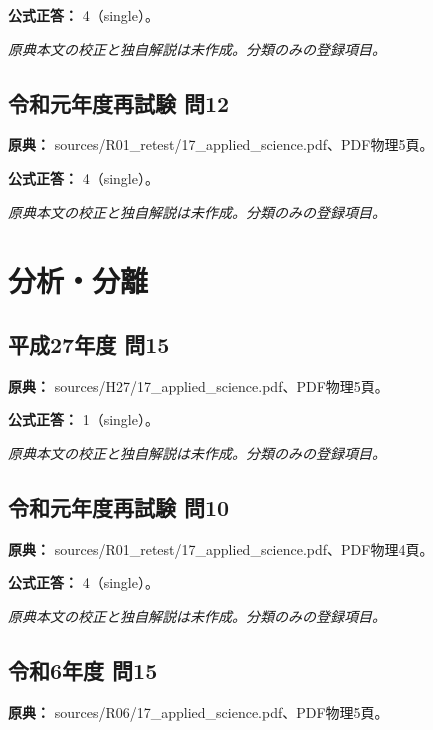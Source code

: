 \textbf{公式正答：} 4（single）。

\par\textit{原典本文の校正と独自解説は未作成。分類のみの登録項目。}

\subsection{令和元年度再試験 問12}
\label{q:r01-ret-applied-12}

\noindent\textbf{原典：} sources/R01\_retest/17\_applied\_science.pdf、PDF物理5頁。

\textbf{公式正答：} 4（single）。

\par\textit{原典本文の校正と独自解説は未作成。分類のみの登録項目。}

\section{分析・分離}

\subsection{平成27年度 問15}
\label{q:h27-reg-applied-15}

\noindent\textbf{原典：} sources/H27/17\_applied\_science.pdf、PDF物理5頁。

\textbf{公式正答：} 1（single）。

\par\textit{原典本文の校正と独自解説は未作成。分類のみの登録項目。}

\subsection{令和元年度再試験 問10}
\label{q:r01-ret-applied-10}

\noindent\textbf{原典：} sources/R01\_retest/17\_applied\_science.pdf、PDF物理4頁。

\textbf{公式正答：} 4（single）。

\par\textit{原典本文の校正と独自解説は未作成。分類のみの登録項目。}

\subsection{令和6年度 問15}
\label{q:r06-reg-applied-15}

\noindent\textbf{原典：} sources/R06/17\_applied\_science.pdf、PDF物理5頁。

